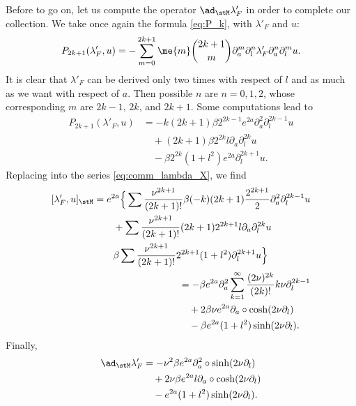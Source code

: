 Before to go on, let us compute the operator $\ad_{\stM}\lambda'_F$ in order to complete our collection. We take once again the formula \eqref{eq:P_k}, with $\lambda'_F$ and $u$:
\begin{equation}
   P_{2k+1}(\lambda'_F,u)=-\sum_{m=0}^{2k+1}\me{m}\binom{2k+1}{m}\partial_a^m\partial_l^n\lambda'_F
                                                                \partial_a^n\partial_l^m u.
\end{equation}
It is clear that $\lambda'_F$ can be derived  only two times with respect of $l$ and as much as we want with respect of $a$. Then possible $n$ are $n=0,1,2$, whose corresponding $m$ are $2k-1$, $2k$, and $2k+1$. Some computations lead to
\begin{equation}
\begin{split}
    P_{2k+1}(\lambda'_F,u)&=-k(2k+1)\beta 2^{2k-1}e^{2a}\partial_a^2\partial_l^{2k-1}u\\
                    &\quad +(2k+1)\beta 2^{2k}l\partial_a\partial_l^{2k}u\\
                    &\quad -\beta 2^{2k}(1+l^2)e^{2a}\partial_l^{2k+1}u.
\end{split}
\end{equation}
Replacing into the series \eqref{eq:comm_lambda_X}, we find
\begin{align*}
\begin{split}
[\lambda'_F,u]_{\stM}&=e^{2a}\Big\{
   \sum\frac{\nu^{2k+1}}{(2k+1)!}\beta (-k)(2k+1)\frac{2^{2k+1}}{2}
                     \partial_a^2\partial_l^{2k-1}u\\
 &\qquad+\sum\frac{\nu^{2k+1}}{(2k+1)!}(2k+1)2^{2k+1}l\partial_a\partial_l^{2k}u\\
 &\qquad\beta\sum\frac{\nu^{2k+1}}{(2k+1)!}2^{2k+1}(1+l^2)\partial_l^{2k+1}u\Big\}
\end{split}\\
\begin{split}
 &=-\beta e^{2a}\partial_a^2\sum_{k=1}^{\infty}\frac{(2\nu)^{2k}}{(2k)!}k\nu\partial_l^{2k-1}\\
 &\quad+2\beta\nu e^{2a}\partial_a\circ\cosh(2\nu\partial_l)\\
 &\quad-\beta e^{2a}(1+l^2)\sinh(2\nu\partial_l).
\end{split}
\end{align*}
Finally,
\begin{equation}
\begin{split}
   \ad_{\stM}\lambda'_F&=-\nu^2\beta e^{2a}\partial_a^2\circ\sinh(2\nu\partial_l)\\
                     &\quad+2\nu\beta e^{2a}l\partial_a\circ\cosh(2\nu\partial_l)\\
		     &\quad-e^{2a}(1+l^2)\sinh(2\nu\partial_l).
\end{split}
\end{equation}

